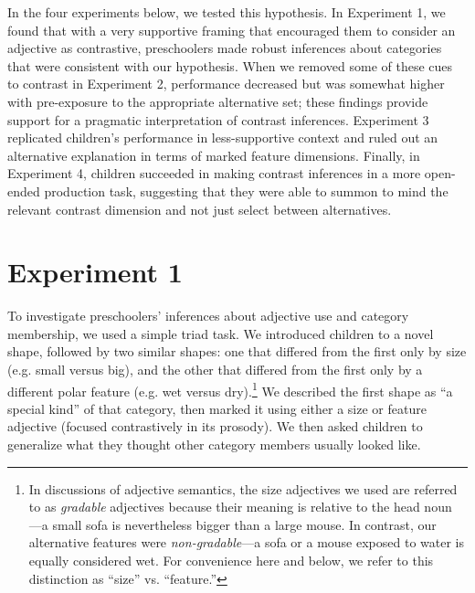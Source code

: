 \documentclass[man]{apa2}
\begin{document}
In the four experiments below, we tested this hypothesis. In Experiment 1, we found that with a very supportive framing that encouraged them to consider an adjective as contrastive, preschoolers made robust inferences about categories that were consistent with our hypothesis. When we removed some of these cues to contrast in Experiment 2, performance decreased but was somewhat higher with pre-exposure to the appropriate alternative set; these findings provide support for a pragmatic interpretation of contrast inferences. Experiment 3 replicated children's performance in less-supportive context and ruled out an alternative explanation in terms of marked feature dimensions. Finally, in Experiment 4, children succeeded in making contrast inferences in a more open-ended production task, suggesting that they were able to summon to mind the relevant contrast dimension and not just select between alternatives. 

\section{Experiment 1}

To investigate preschoolers' inferences about adjective use and category membership, we used a simple triad task.  We introduced children to a novel shape, followed by two similar shapes: one that differed from the first only by size (e.g. small versus big), and the other that differed from the first only by a different polar feature (e.g. wet versus dry).\footnote{In discussions of adjective semantics, the size adjectives we used are referred to as \emph{gradable} adjectives because their meaning is relative to the head noun \cite{kennedy2012}---a small sofa is nevertheless bigger than a large mouse. In contrast, our alternative features were \emph{non-gradable}---a sofa or a mouse exposed to water is equally considered wet. For convenience here and below, we refer to this distinction as ``size'' vs. ``feature.''} We described the first shape as ``a special kind'' of that category, then marked it using either a size or feature adjective (focused contrastively in its prosody). We then asked children to generalize what they thought other category members usually looked like. 
\end{document}
